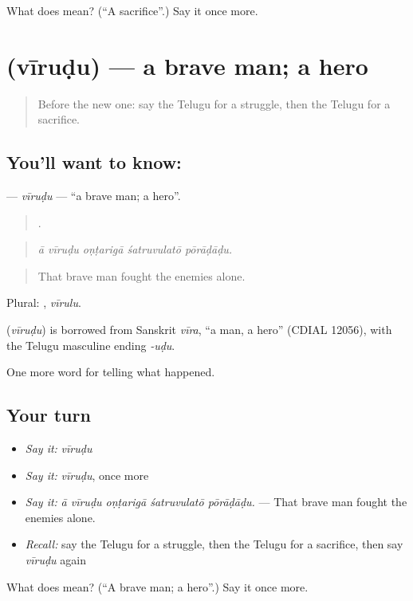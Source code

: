 \begin{tcolorbox}[breakable,colback=teal!4,colframe=teal!35!black,title={Before you move on}]
What does  mean? (\textquotedblleft{}A sacrifice\textquotedblright{}.) Say it once more.
\end{tcolorbox}
\section[\texorpdfstring{\te{వీరుడు} (vīruḍu)}{వీరుడు (vīruḍu)}]{ (vīruḍu) — a brave man; a hero}

\label{lesson:TE-C364-virudu}



\begin{quote}
Before the new one: say the Telugu for a struggle, then the Telugu for a sacrifice.
\end{quote}

\subsection*{You'll want to know: }
\textbf{} — \emph{vīruḍu} — \textquotedblleft{}a brave man; a hero\textquotedblright{}.

\begin{quote}
    .
\end{quote}

\begin{quote}
\emph{ā vīruḍu oṇṭarigā śatruvulatō pōrāḍāḍu.}
\end{quote}

\begin{quote}
That brave man fought the enemies alone.
\end{quote}

Plural: , \emph{vīrulu}.

\begin{cousinweb}
\textbf{} (\emph{vīruḍu}) is borrowed from Sanskrit \emph{vīra}, \textquotedblleft{}a man, a hero\textquotedblright{} (CDIAL 12056), with the Telugu masculine ending \emph{-uḍu}.
\end{cousinweb}

\begin{grammarlens}[title={What you've built}]
One more word for telling what happened.
\end{grammarlens}

\subsection*{Your turn}
\begin{itemize}
\raggedright
  \item \emph{Say it:} \emph{vīruḍu}
  \item \emph{Say it:} \emph{vīruḍu}, once more
  \item \emph{Say it:} \emph{ā vīruḍu oṇṭarigā śatruvulatō pōrāḍāḍu.} — That brave man fought the enemies alone.
  \item \emph{Recall:} say the Telugu for a struggle, then the Telugu for a sacrifice, then say \emph{vīruḍu} again
\end{itemize}

\begin{tcolorbox}[breakable,colback=teal!4,colframe=teal!35!black,title={Before you move on}]
What does  mean? (\textquotedblleft{}A brave man; a hero\textquotedblright{}.) Say it once more.
\end{tcolorbox}
